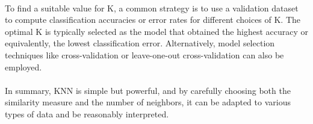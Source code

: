\\
To find a suitable value for K, a common strategy is to use a validation dataset to compute classification accuracies or error rates for different choices of K. The optimal K is typically selected as the model that obtained the highest accuracy or equivalently, the lowest classification error. Alternatively, model selection techniques like cross-validation or leave-one-out cross-validation can also be employed.\\
\\
In summary, KNN is simple but powerful, and by carefully choosing both the similarity measure and the number of neighbors, it can be adapted to various types of data and be reasonably interpreted.\\
\\

